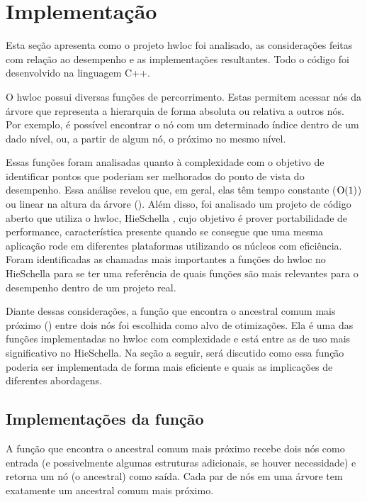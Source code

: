 \chapter{Implementação}

Esta seção apresenta como o projeto hwloc foi analisado, as considerações feitas com relação ao desempenho e as implementações resultantes.
Todo o código foi desenvolvido na linguagem C++.

O hwloc possui diversas funções de percorrimento.
Estas permitem acessar nós da árvore que representa a hierarquia de forma absoluta ou relativa a outros nós.
Por exemplo, é possível encontrar o nó com um determinado índice dentro de um dado nível,
ou, a partir de algum nó, o próximo no mesmo nível.

Essas funções foram analisadas quanto à complexidade com o objetivo de identificar pontos que poderiam ser melhorados do ponto de vista do desempenho.
Essa análise revelou que, em geral, elas têm tempo constante ($\operatorname{O}(1)$) ou linear na altura da árvore (\Oalt).
Além disso, foi analisado um projeto de código aberto que utiliza o hwloc, HieSchella \tratar{[ref]},
cujo objetivo é prover portabilidade de performance, característica presente quando se consegue que
uma mesma aplicação rode em diferentes plataformas utilizando os núcleos com eficiência.
Foram identificadas as chamadas mais importantes a funções do hwloc no HieSchella para se ter uma referência
de quais funções são mais relevantes para o desempenho dentro de um projeto real.

Diante dessas considerações, a função que encontra o ancestral comum mais próximo (\fACMP) entre dois nós foi escolhida como alvo de otimizações.
Ela é uma das funções implementadas no hwloc com complexidade \Oalt e está entre as de uso mais significativo no HieSchella.
Na seção a seguir, será discutido como essa função poderia ser implementada de forma mais eficiente e quais as implicações de diferentes abordagens.


\section{Implementações da função \fACMP}

A função que encontra o ancestral comum mais próximo recebe dois nós como entrada (e possivelmente algumas estruturas adicionais, se houver necessidade)
e retorna um nó (o ancestral) como saída.
Cada par de nós em uma árvore tem exatamente um ancestral comum mais próximo.

